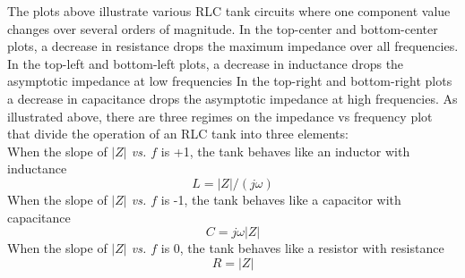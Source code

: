 \documentclass[11pt,twoside]{mitthesis}
\begin{document}
The plots above illustrate various RLC tank circuits where one component value changes over several orders of magnitude.
In the top-center and bottom-center plots, a decrease in resistance drops the maximum impedance over all frequencies.
In the top-left and bottom-left plots, a decrease in inductance drops the asymptotic impedance at low frequencies
In the top-right and bottom-right plots a decrease in capacitance drops the asymptotic impedance at high frequencies.
As illustrated above, there are three regimes on the impedance vs frequency plot that divide the operation of an RLC tank into three elements:\\
When the slope of \emph{$|Z|$ vs. $f$} is +1, the tank behaves like an inductor with inductance
\begin{equation*}
L=|Z|/(j\omega)
\end{equation*}
When the slope of \emph{$|Z|$ vs. $f$} is -1, the tank behaves like a capacitor with capacitance
\begin{equation*}
C=j\omega |Z|
\end{equation*}
When the slope of \emph{$|Z|$ vs. $f$} is 0, the tank behaves like a resistor with resistance
\begin{equation*}
R=|Z|
\end{equation*}
\end{document}
